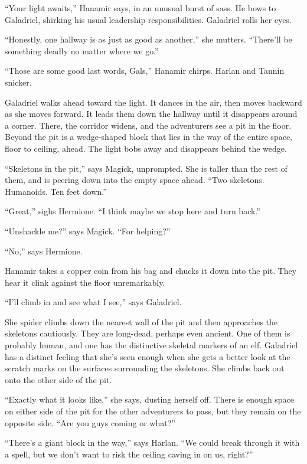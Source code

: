 \documentclass[smalldemyvopaper,11pt,twoside,onecolumn,openright,extrafontsizes]{memoir}
\begin{document}
``Your light awaits,'' Hanamir says, in an unusual burst of sass. He
bows to Galadriel, shirking his usual leadership responsibilities.
Galadriel rolls her eyes.

``Honestly, one hallway is as just as good as another,'' she mutters.
``There'll be something deadly no matter where we go.''

``Those are some good last words, Gals,'' Hanamir chirps. Harlan and
Tannin snicker.

Galadriel walks ahead toward the light. It dances in the air, then moves
backward as she moves forward. It leads them down the hallway until it
disappears around a corner. There, the corridor widens, and the
adventurers see a pit in the floor. Beyond the pit is a wedge-shaped
block that lies in the way of the entire space, floor to ceiling, ahead.
The light bobs away and disappears behind the wedge.

``Skeletons in the pit,'' says Magick, unprompted. She is taller than
the rest of them, and is peering down into the empty space ahead. ``Two
skeletons. Humanoids. Ten feet down.''

``Great,'' sighs Hermione. ``I think maybe we stop here and turn back.''

``Unshackle me?'' says Magick. ``For helping?''

``No,'' says Hermione.

Hanamir takes a copper coin from his bag and chucks it down into the
pit. They hear it clink against the floor unremarkably.

``I'll climb in and see what I see,'' says Galadriel.

She spider climbs down the nearest wall of the pit and then approaches
the skeletons cautiously. They are long-dead, perhaps even ancient. One
of them is probably human, and one has the distinctive skeletal markers
of an elf. Galadriel has a distinct feeling that she's seen enough when
she gets a better look at the scratch marks on the surfaces surrounding
the skeletons. She climbs back out onto the other side of the pit.

``Exactly what it looks like,'' she says, dusting herself off. There is
enough space on either side of the pit for the other adventurers to
pass, but they remain on the opposite side. ``Are you guys coming or
what?''

``There's a giant block in the way,'' says Harlan. ``We could break
through it with a spell, but we don't want to risk the ceiling caving in
on us, right?''
\end{document}
